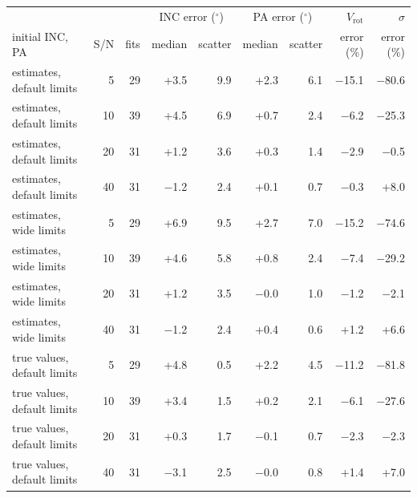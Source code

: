 \begin{tabular}{l r r rr rr rr}
\toprule
 & & & \multicolumn{2}{c}{INC error ($^\circ$)} & \multicolumn{2}{c}{PA error ($^\circ$)} & $V_\mathrm{rot}$ & $\sigma$ \\
initial INC, PA & S/N & fits & median & scatter & median & scatter & error (\%) & error (\%) \\
\midrule
estimates, default limits & 5 & 29 & +3.5 & 9.9 & +2.3 & 6.1 & $-$15.1 & $-$80.6 \\
estimates, default limits & 10 & 39 & +4.5 & 6.9 & +0.7 & 2.4 & $-$6.2 & $-$25.3 \\
estimates, default limits & 20 & 31 & +1.2 & 3.6 & +0.3 & 1.4 & $-$2.9 & $-$0.5 \\
estimates, default limits & 40 & 31 & $-$1.2 & 2.4 & +0.1 & 0.7 & $-$0.3 & +8.0 \\
\addlinespace
estimates, wide limits & 5 & 29 & +6.9 & 9.5 & +2.7 & 7.0 & $-$15.2 & $-$74.6 \\
estimates, wide limits & 10 & 39 & +4.6 & 5.8 & +0.8 & 2.4 & $-$7.4 & $-$29.2 \\
estimates, wide limits & 20 & 31 & +1.2 & 3.5 & $-$0.0 & 1.0 & $-$1.2 & $-$2.1 \\
estimates, wide limits & 40 & 31 & $-$1.2 & 2.4 & +0.4 & 0.6 & +1.2 & +6.6 \\
\addlinespace
true values, default limits & 5 & 29 & +4.8 & 0.5 & +2.2 & 4.5 & $-$11.2 & $-$81.8 \\
true values, default limits & 10 & 39 & +3.4 & 1.5 & +0.2 & 2.1 & $-$6.1 & $-$27.6 \\
true values, default limits & 20 & 31 & +0.3 & 1.7 & $-$0.1 & 0.7 & $-$2.3 & $-$2.3 \\
true values, default limits & 40 & 31 & $-$3.1 & 2.5 & $-$0.0 & 0.8 & +1.4 & +7.0 \\
\bottomrule
\end{tabular}
